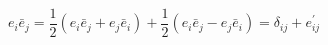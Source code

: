 \begin{equation}
e_i \bar{e}_j =\frac{1}{2} (e_i \bar{e}_j+e_j \bar{e}_i) +\frac{1}{2}(e_i \bar{e}_j - e_j \bar{e}_i)=\delta_{ij}+e^{'}_{ij}
\end{equation}

